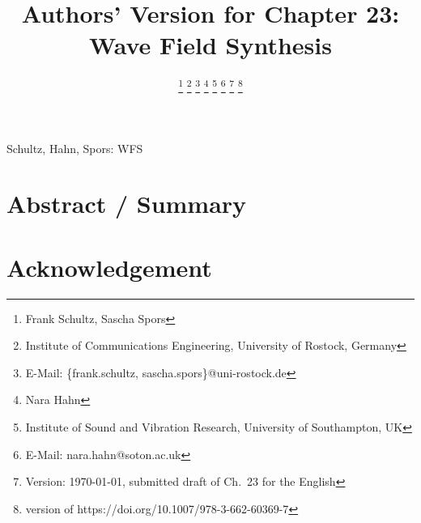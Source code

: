 \documentclass[10pt, journal, transmag]{IEEEtran}
\newcommand*{\SPRINGER}{}
\begin{document}
\title{Authors' Version for Chapter 23: Wave Field Synthesis}
\author{
\ifdefined\SPRINGER
{}
\else  %
\fi
\thanks{Frank Schultz, Sascha Spors}
\thanks{Institute of Communications Engineering, University of Rostock, Germany}
\thanks{E-Mail: \{frank.schultz, sascha.spors\}@uni-rostock.de}
%
\thanks{Nara Hahn}
\thanks{Institute of Sound and Vibration Research, University of Southampton, UK}
\thanks{E-Mail: nara.hahn@soton.ac.uk}
%
\thanks{Version: \today, submitted draft of Ch.~23 for the English}
\thanks{version of https://doi.org/10.1007/978-3-662-60369-7}
}
%
%
{Schultz, Hahn, Spors: WFS}
%
%
\maketitle
%
\section*{Abstract / Summary}

%

%
\section*{Acknowledgement}

%
\ifdefined\SPRINGER
    
    
\else
    
    
\fi
%
\printindex
%
\end{document}
